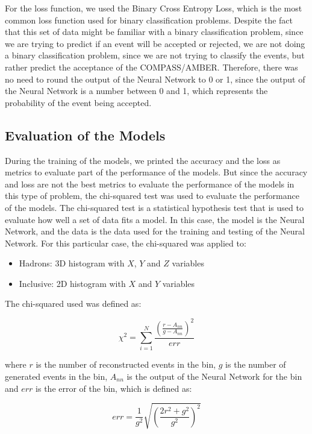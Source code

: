 \documentclass{article}
\begin{document}
For the loss function, we used the Binary Cross Entropy Loss, which is the most common loss function used for binary classification problems.
Despite the fact that this set of data might be familiar with a binary classification problem, since we are trying to predict if an event will be accepted or rejected,
we are not doing a binary classification problem, since we are not trying to classify the events, but rather predict the acceptance of the COMPASS/AMBER.
Therefore, there was no need to round the output of the Neural Network to 0 or 1, since the output of the Neural Network is a number between 0 and 1, which represents the probability of the event being accepted.

\subsection{Evaluation of the Models}

During the training of the models, we printed the accuracy and the loss as metrics to evaluate part of the performance of the models.
But since the accuracy and loss are not the best metrics to evaluate the performance of the models in this type of problem, the chi-squared test was used to evaluate the performance of the models.
The chi-squared test is a statistical hypothesis test that is used to evaluate how well a set of data fits a model. In this case, the model is the Neural Network, and the data is the data used for the training and testing of the Neural Network.
For this particular case, the chi-squared was applied to:
\begin{itemize}
    \item Hadrons: 3D histogram with $X$, $Y$ and $Z$ variables
    \item Inclusive: 2D histogram with $X$ and $Y$ variables
\end{itemize}

The chi-squared used was defined as:

\begin{equation}
    \chi^2 = \sum_{i=1}^{N} \frac{(\frac{r - A_{nn}}{g - A_{nn}})^2}{err}
\end{equation}
    
where $r$ is the number of reconstructed events in the bin, $g$ is the number of generated events in the bin, $A_{nn}$ is the output of the Neural Network for the bin and $err$ is the error of the bin, which is defined as:

\begin{equation}
    err = \frac{1}{g^2}\sqrt{(\frac{2r^2 + g^2}{g^2})^2}
\end{equation}
\end{document}
